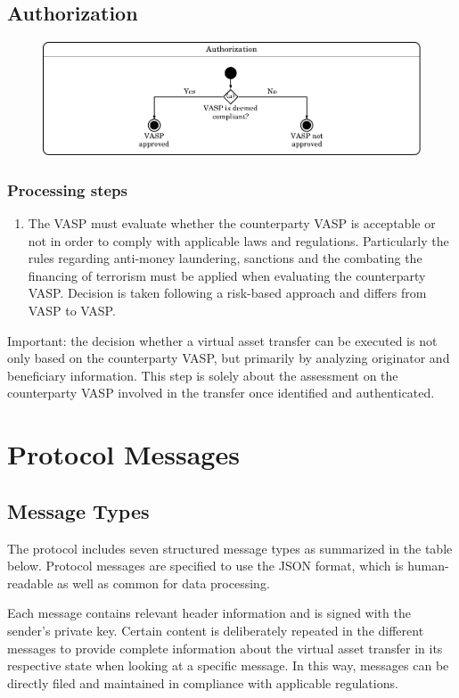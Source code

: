 \documentclass{article}
\begin{document}
\subsection{Authorization}

\begin{figure}[h]
    \centering
    \includegraphics[width=\textwidth]{g17.pdf}
\end{figure}
\subsubsection{Processing steps}
\begin{enumerate}
    \item The VASP must evaluate whether the counterparty VASP is acceptable or not in order to comply with applicable laws and regulations.	Particularly the rules regarding anti-money laundering, sanctions and the combating the financing of terrorism must be applied when evaluating the counterparty VASP. Decision is taken following a risk-based approach and differs from VASP to VASP.
\end{enumerate}

Important: the decision whether a virtual asset transfer can be executed is not only based on the counterparty VASP, but primarily by analyzing originator and beneficiary information. This step is solely about the assessment on the counterparty VASP involved in the transfer once identified and authenticated.	
\newpage
\section{Protocol Messages}

\subsection{Message Types}
The protocol includes seven structured message types as summarized in the table below. Protocol messages are specified to use the JSON format, which is human-readable as well as common for data processing.

Each message contains relevant header information and is signed with the sender’s private key.  Certain content is deliberately repeated in the different messages to provide complete information about the virtual asset transfer in its respective state when looking at a specific message. In this way, messages can be directly filed and maintained in compliance with applicable regulations.
\end{document}
